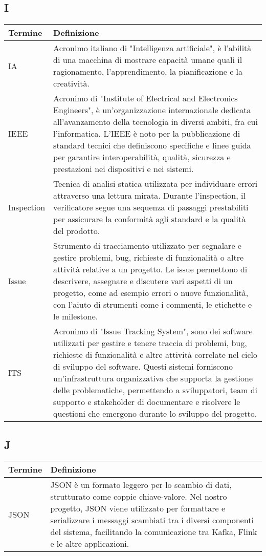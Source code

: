 \documentclass[10pt]{article}
\begin{document}
\subsection{I} %
\begin{longtable}{|>{\centering\arraybackslash}m{2.5cm}|>{\arraybackslash}m{12.5cm}|}
\hline
\rowcolor[gray]{0.8}
\textbf{Termine} & \textbf{Definizione}\\
\endhead
\hline
IA & Acronimo italiano di "Intelligenza artificiale", è l'abilità di una macchina di mostrare capacità umane quali il ragionamento, l'apprendimento, la pianificazione e la creatività.\\
\hline
IEEE & Acronimo di "Institute of Electrical and Electronics Engineers", è un'organizzazione internazionale dedicata all'avanzamento della tecnologia in diversi ambiti, fra cui l'informatica. L'IEEE è noto per la pubblicazione di standard tecnici che definiscono specifiche e linee guida per garantire interoperabilità, qualità, sicurezza e prestazioni nei dispositivi e nei sistemi.\\
\hline
Inspection & Tecnica di analisi statica utilizzata per individuare errori attraverso una lettura mirata. Durante l'inspection, il verificatore segue una sequenza di passaggi prestabiliti per assicurare la conformità agli standard e la qualità del prodotto.\\
\hline
Issue & Strumento di tracciamento utilizzato per segnalare e gestire problemi, bug, richieste di funzionalità o altre attività relative a un progetto. Le issue permettono di descrivere, assegnare e discutere vari aspetti di un progetto, come ad esempio errori o nuove funzionalità, con l'aiuto di strumenti come i commenti, le etichette e le milestone.\\
\hline
ITS & Acronimo di "Issue Tracking System", sono dei software utilizzati per gestire e tenere traccia di problemi, bug, richieste di funzionalità e altre attività correlate nel ciclo di sviluppo del software. Questi sistemi forniscono un'infrastruttura organizzativa che supporta la gestione delle problematiche, permettendo a sviluppatori, team di supporto e stakeholder di documentare e risolvere le questioni che emergono durante lo sviluppo del progetto.\\
\hline
\end{longtable}

\subsection{J} %
\begin{longtable}{|>{\centering\arraybackslash}m{2.5cm}|>{\arraybackslash}m{12.5cm}|}
\hline
\rowcolor[gray]{0.8}
\textbf{Termine} & \textbf{Definizione}\\
\endhead
\hline
JSON & JSON è un formato leggero per lo scambio di dati, strutturato come coppie chiave-valore. Nel nostro progetto, JSON viene utilizzato per formattare e serializzare i messaggi scambiati tra i diversi componenti del sistema, facilitando la comunicazione tra Kafka, Flink e le altre applicazioni.\\
\hline
\end{longtable}
\end{document}
